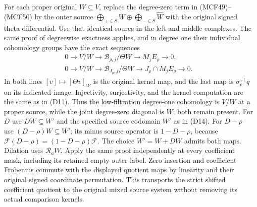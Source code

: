 For each proper original $W\subseteq V$, replace the degree-zero
term in (MCF49)--(MCF50) by the outer source
$\bigoplus_{+\in S}W\oplus\bigoplus_{-\in S}\widehat W$ with
the original signed theta differential.  Use that identical
source in the left and middle complexes.  The same proof of
degreewise exactness applies, and in degree one their individual
cohomology groups have the exact sequences
\[
\begin{gathered}
0\longrightarrow V/W\longrightarrow
\mathscr B_{\rho,j}/\Theta W\longrightarrow M_jE_\rho
\longrightarrow0,\\
0\longrightarrow V/W\longrightarrow
\mathscr B_{J_\rho,j}/\Theta W\longrightarrow
J_\rho\cap M_jE_\rho\longrightarrow0.
\end{gathered}
\tag{MCF51}
\]
In both lines $[v]\mapsto[\Theta v]_W$ is the original kernel
map, and the last map is $\sigma_\rho^{-1}q$ on its indicated
image.  Injectivity, surjectivity, and the kernel computation
are the same as in (D11).  Thus the low-filtration degree-one
cohomology is $V/W$ at a proper source, while the joint
degree-zero diagonal is $W$; both remain present.
For $D$ use $DW\subseteq W'$ and the specified source codomain
$W'$ as in (D14).  For $D-\rho$ use $(D-\rho)W\subseteq W'$;
its minus source operator is $1-D-\rho$, because
$\mathcal F(D-\rho)=(1-D-\rho)\mathcal F$.
The choice $W'=W+DW$ admits both maps.  Dilation uses
$\mathcal R_aW$.  Apply the same proof independently at every
coefficient mask, including its retained empty outer label.
Zero insertion and coefficient Frobenius commute with the
displayed quotient maps by linearity and their original signed
coordinate permutation.  This transports the strict shifted
coefficient quotient to the original mixed source system
without removing its actual comparison kernels.
